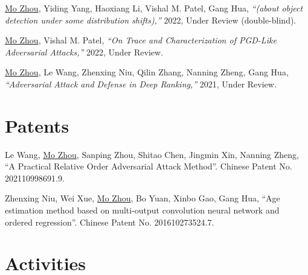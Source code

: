 \documentclass[10pt,margin,line,pifont,palatino,courier]{res}
\begin{document}
\begin{resume}
\begin{enumerate}[noitemsep, leftmargin=*, label={[X0{\arabic*}]}]
\item \underline{Mo Zhou}, Yiding Yang, Haoxiang Li, Vishal M. Patel, Gang Hua,
	\textit{``(about object detection under some distribution shifts),''}
2022, Under Review (double-blind).


\item \underline{Mo Zhou}, Vishal M. Patel,
\reversemarginpar{}
\textit{``On Trace and Characterization of PGD-Like Adversarial Attacks,''}
2022, Under Review.

\item \underline{Mo Zhou},
\reversemarginpar{}
Le Wang, Zhenxing Niu, Qilin Zhang, Nanning Zheng, Gang Hua,
\textit{``Adversarial Attack and Defense in Deep Ranking,''}
2021, Under Review.

\end{enumerate}

\section{\sc Patents}

\begin{enumerate}[noitemsep, leftmargin=*, label={[P0{\arabic*}]}]

\item Le Wang, \underline{Mo Zhou}, Sanping Zhou, Shitao Chen, Jingmin Xin, Nanning Zheng,
	``A Practical Relative Order Adversarial Attack Method''.
	Chinese Patent No. 202110998691.9.

\item Zhenxing Niu, Wei Xue, \underline{Mo Zhou}, Bo Yuan, Xinbo Gao, Gang Hua,
	``Age estimation method based on multi-output convolution neural
	network and ordered regression''. Chinese Patent No. 201610273524.7.

\end{enumerate}

\section{\sc Activities}


\end{resume}
\end{document}
